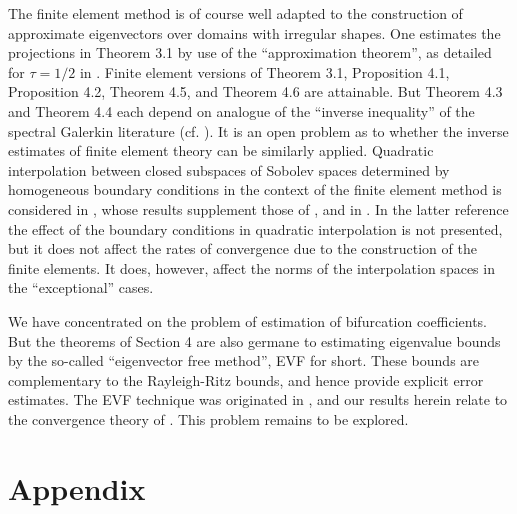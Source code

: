 \documentclass[final]{siamltex}
\numberwithin{equation}{section}
\begin{document}
The finite element method is of course well adapted to the construction of approximate eigenvectors over domains with irregular shapes. One estimates the projections in Theorem 3.1 by use of the ``approximation theorem'', as detailed for $\tau=1/2$ in \cite{Strang-Fix}. Finite element versions of Theorem 3.1, Proposition 4.1, Proposition 4.2, Theorem 4.5, and Theorem 4.6 are attainable. But Theorem 4.3 and Theorem 4.4 each depend on analogue of the ``inverse inequality'' of the spectral Galerkin literature (cf. \cite{Mercier}). It is an open problem as to whether the inverse estimates of finite element theory \cite{Brenner-Scott} can be similarly applied. Quadratic interpolation between closed subspaces of Sobolev spaces determined by homogeneous boundary conditions in the context of the finite element method is considered in \cite{Bramble}, whose results supplement those of \cite{Greenlee}, and in \cite{Brenner-Scott}. In the latter reference the effect of the boundary conditions in quadratic interpolation is not presented, but it does not affect the rates of convergence due to the construction of the finite elements. It does, however, affect the norms of the interpolation spaces in the ``exceptional'' cases.

We have concentrated on the problem of estimation of bifurcation coefficients. But the theorems of Section 4 are also germane to estimating eigenvalue bounds by the so-called ``eigenvector free method'', EVF for short. These bounds are complementary to the Rayleigh-Ritz bounds, and hence provide explicit error estimates. The EVF technique was originated in \cite{Gay-EVF}, and our results herein relate to the convergence theory of
\cite{Beattie-Greenlee-proc}. This problem remains to be explored.

  
  \setcounter{equation}{0}  
  \section*{Appendix}  
  \label{appendixA}
\end{document}
